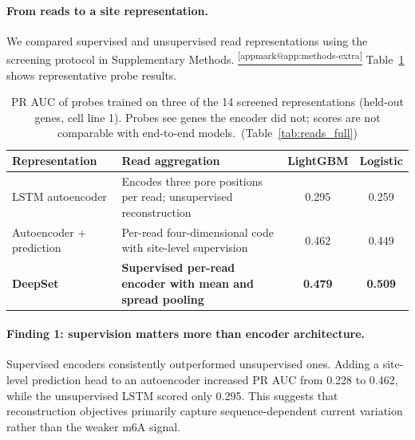 \documentclass[11pt,a4paper]{article}
\makeatletter
\DeclareRobustCommand{\applink}[1]{%
    \hyperref[#1]{\textsuperscript{\ref*{appmark@#1}}}}
\makeatother
\begin{document}
\paragraph{From reads to a site representation.}



We compared supervised and unsupervised read representations using the
screening protocol in Supplementary Methods.\applink{app:methods-extra}
Table~\ref{tab:reads} shows representative probe results.

\begin{table}[H]
    \centering\small
    \begin{tabularx}{\linewidth}{lYcc}
        \toprule
        \textbf{Representation} & \textbf{Read aggregation} & \textbf{LightGBM} & \textbf{Logistic} \\
        \midrule
        LSTM autoencoder & Encodes three pore positions per read; unsupervised reconstruction & 0.295 & 0.259 \\
        Autoencoder + prediction & Per-read four-dimensional code with site-level supervision & 0.462 & 0.449 \\
        \textbf{DeepSet} & \textbf{Supervised per-read encoder with mean and spread pooling} & \textbf{0.479} & \textbf{0.509} \\
        \bottomrule
    \end{tabularx}
    \caption{PR AUC of probes trained on three of the 14 screened representations (held-out genes, cell line 1). Probes see genes the encoder did not; scores are not comparable with end-to-end models.~(Table~\ref{tab:reads_full})}
    \label{tab:reads}
\end{table}

\paragraph{Finding 1: supervision matters more than encoder architecture.}
Supervised encoders consistently outperformed unsupervised ones. Adding a site-level prediction head to an autoencoder increased PR AUC from 0.228 to 0.462, while the unsupervised LSTM scored only 0.295. This suggests that reconstruction objectives primarily capture sequence-dependent current variation rather than the weaker m6A signal.
\end{document}
